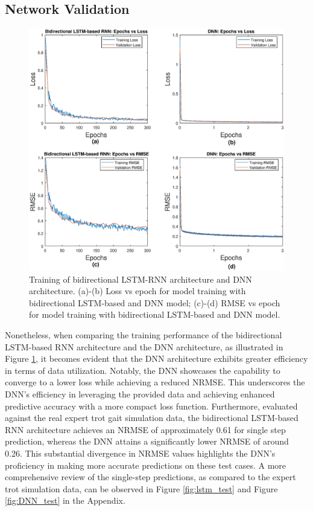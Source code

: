 \subsection{Network Validation}
\begin{figure}[htb]
    \centering
    \includegraphics[width=\linewidth]{img/chap4/train_result.eps}
    \caption{Training of bidirectional LSTM-RNN architecture and DNN architecture. (a)-(b) Loss vs epoch for model training with bidirectional LSTM-based and DNN model; (c)-(d) RMSE vs epoch for model training with bidirectional LSTM-based and DNN model.}
    \label{fig:train2net}
\end{figure}

Nonetheless, when comparing the training performance of the bidirectional LSTM-based RNN architecture and the DNN architecture, as illustrated in Figure \ref{fig:train2net}, it becomes evident that the DNN architecture exhibits greater efficiency in terms of data utilization. Notably, the DNN showcases the capability to converge to a lower loss while achieving a reduced \ac{NRMSE}. This underscores the DNN's efficiency in leveraging the provided data and achieving enhanced predictive accuracy with a more compact loss function. Furthermore, evaluated against the real expert trot gait simulation data, the bidirectional LSTM-based RNN architecture achieves an NRMSE of approximately 0.61 for single step prediction, whereas the DNN attains a significantly lower NRMSE of around 0.26. This substantial divergence in NRMSE values highlights the DNN's proficiency in making more accurate predictions on these test cases. A more comprehensive review of the single-step predictions, as compared to the expert trot simulation data, can be observed in Figure \ref{fig:lstm_test} and Figure \ref{fig:DNN_test} in the Appendix. 

